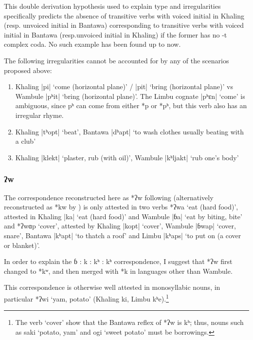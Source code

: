 \documentclass[oneside,a4paper,11pt]{article}
\newcommand{\ipa}[1]{{\phon\mbox{#1}}} %
\newcommand{\dhatu}[2]{|\ipa{#1}| `#2'}
\begin{document}
 This double derivation hypothesis used to explain type  and irregularities specifically predicts the absence of transitive verbs with voiced initial in Khaling (resp. unvoiced initial in Bantawa) corresponding to transitive verbs with voiced initial in Bantawa (resp.unvoiced initial in Khaling) if the former has no \ipa{-t} complex coda. No such example has been found up to now.
 
The following irregularities cannot be accounted for by any of the scenarios proposed above:

\begin{enumerate}
\item  Khaling \dhatu{pi}{come (horizontal plane)} / \dhatu{pit}{bring (horizontal plane)} vs Wambule \dhatu{pʰit}{bring (horizontal plane)}. The Limbu cognate \dhatu{pʰɛn}{come} is ambiguous, since \ipa{pʰ} can come from either \ipa{*p} or \ipa{*pʰ}, but this verb also has an irregular rhyme. 
\item Khaling  \dhatu{tʰopt}{beat}, Bantawa \dhatu{dʰapt}{to wash clothes usually beating with a club}
\item Khaling  \dhatu{klekt}{plaster, rub (with oil)}, Wambule \dhatu{kʰljakt}{rub one's body}
 \end{enumerate}

\subsubsection{\ipa{ʔw}}
The correspondence reconstructed here as *\ipa{ʔw} following \citet{michailovsky94stops} (alternatively reconstructed as *\ipa{kw} by \citealt{opgenort04implosives}) is only attested in two verbs *\ipa{ʔwa} `eat (hard food)', attested in Khaling \dhatu{ka}{eat (hard food)} and Wambule \dhatu{ɓa}{eat by biting, bite} and  *\ipa{ʔwɑp} `cover', attested by  Khaling \dhatu{kopt}{cover}, Wambule \dhatu{ɓwap}{cover, snare}, Bantawa \dhatu{kʰapt}{to thatch a roof} and Limbu  \dhatu{kʰaps}{to put on (a cover or blanket)}. 

In order to explain the \ipa{ɓ} : \ipa{k} : \ipa{kʰ} : \ipa{kʰ} correspondence, I suggest that  *\ipa{ʔw} first changed to *\ipa{kʷ}, and then merged with *\ipa{k} in languages other than Wambule.
 
 This correspondence is otherwise well attested in monosyllabic nouns, in particular *\ipa{ʔwi} `yam, potato' (Khaling \ipa{ki}, Limbu \ipa{kʰe}).\footnote{The verb `cover' show that the Bantawa reflex of *\ipa{ʔw} is \ipa{kʰ}; thus, nouns such as \ipa{saki} `potato, yam' and \ipa{ogi} `sweet potato' must be borrowings.}
\end{document}
